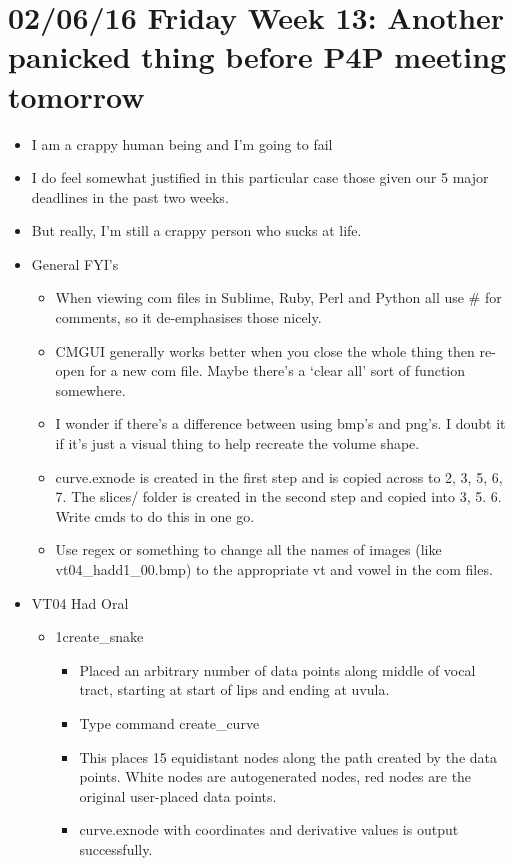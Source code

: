 \documentclass{article}
\begin{document}
\section*{02/06/16 Friday Week 13: Another panicked thing before P4P meeting tomorrow}
\begin{itemize}
    \item I am a crappy human being and I'm going to fail
    \item I do feel somewhat justified in this particular case those given our 5 major deadlines in the past two weeks.
    \item But really, I'm still a crappy person who sucks at life.
    
    \item General FYI's
    \begin{itemize}
        \item When viewing com files in Sublime, Ruby, Perl and Python all use \# for comments, so it de-emphasises those nicely.
        \item CMGUI generally works better when you close the whole thing then re-open for a new com file. Maybe there's a `clear all' sort of function somewhere.
        \item I wonder if there's a difference between using bmp's and png's. I doubt it if it's just a visual thing to help recreate the volume shape.
        \item curve.exnode is created in the first step and is copied across to 2, 3, 5, 6, 7. The slices/ folder is created in the second step and copied into 3, 5. 6. Write cmds to do this in one go.
        \item Use regex or something to change all the names of images (like vt04\_hadd1\_00.bmp) to the appropriate vt and vowel in the com files.
    \end{itemize}
    
    \item VT04 Had Oral
    
    \begin{itemize}
        \item 1create\_snake
        \begin{itemize}
            \item Placed an arbitrary number of data points along middle of vocal tract, starting at start of lips and ending at uvula.
            \item Type command create\_curve
            \item This places 15 equidistant nodes along the path created by the data points. White nodes are autogenerated nodes, red nodes are the original user-placed data points.
            \item curve.exnode with coordinates and derivative values is output successfully.
        \end{itemize}
        

\end{itemize}
\end{itemize}
\end{document}
